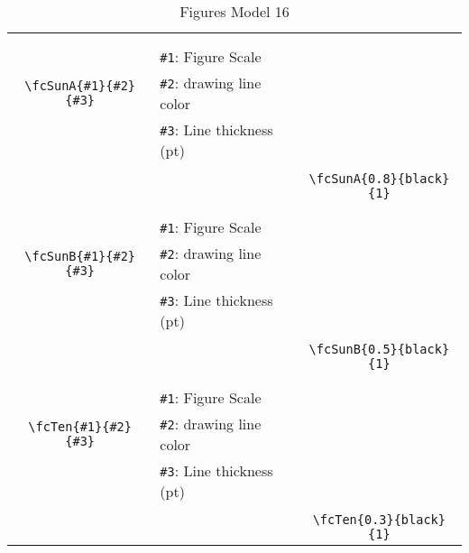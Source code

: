 \documentclass{article}
\begin{document}
\begin{table}[H]
\begin{tabular}{|c|l|c|}
	&&\multirow{5}{*}{\fcSunA{0.8}{black}{1}}\\	&&\\	&\verb|#1|: Figure Scale &\\	\verb|\fcSunA{#1}{#2}{#3}|&	\verb|#2|: drawing line color &\\	&\verb|#3|: Line thickness (pt) &\\ &&\\&&	\verb|\fcSunA{0.8}{black}{1}|\\\hline 	
	&&\multirow{5}{*}{\fcSunB{0.5}{black}{1}}\\	&&\\	&\verb|#1|: Figure Scale &\\	\verb|\fcSunB{#1}{#2}{#3}|&	\verb|#2|: drawing line color &\\	&\verb|#3|: Line thickness (pt) &\\ &&\\&&	\verb|\fcSunB{0.5}{black}{1}|\\\hline 	
	&&\multirow{5}{*}{\fcTen{0.3}{black}{1}}\\	&&\\	&\verb|#1|: Figure Scale &\\	\verb|\fcTen{#1}{#2}{#3}|&	\verb|#2|: drawing line color &\\	&\verb|#3|: Line thickness (pt) &\\ &&\\&&	\verb|\fcTen{0.3}{black}{1}|\\\hline 	\hline\end{tabular}\caption{Figures Model 16}\label{tab16}\end{table}
\end{document}
